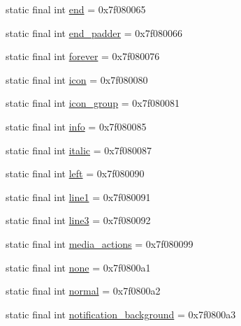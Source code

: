 \begin{DoxyCompactItemize}
\item 
static final int \mbox{\hyperlink{classandroid_1_1support_1_1v4_1_1_r_1_1id_ab07961478cba8046460b156bfe29c5e4}{end}} = 0x7f080065
\item 
static final int \mbox{\hyperlink{classandroid_1_1support_1_1v4_1_1_r_1_1id_a8e2de59a9001feb70cbf25a63296a6c4}{end\+\_\+padder}} = 0x7f080066
\item 
static final int \mbox{\hyperlink{classandroid_1_1support_1_1v4_1_1_r_1_1id_a5883771ab7e95823c127b5d3013e0dfe}{forever}} = 0x7f080076
\item 
static final int \mbox{\hyperlink{classandroid_1_1support_1_1v4_1_1_r_1_1id_a62604496896d5069c3673d6ff13b2dee}{icon}} = 0x7f080080
\item 
static final int \mbox{\hyperlink{classandroid_1_1support_1_1v4_1_1_r_1_1id_a540e31dc0dde6271ea50f4f8d1b86cd5}{icon\+\_\+group}} = 0x7f080081
\item 
static final int \mbox{\hyperlink{classandroid_1_1support_1_1v4_1_1_r_1_1id_af9b4f5497aef6dd0520bfb1b3d5dd026}{info}} = 0x7f080085
\item 
static final int \mbox{\hyperlink{classandroid_1_1support_1_1v4_1_1_r_1_1id_a9996d770f69100664e988763ccf14804}{italic}} = 0x7f080087
\item 
static final int \mbox{\hyperlink{classandroid_1_1support_1_1v4_1_1_r_1_1id_a8e61961887a658253c7357282f98ccba}{left}} = 0x7f080090
\item 
static final int \mbox{\hyperlink{classandroid_1_1support_1_1v4_1_1_r_1_1id_ae38dbdf66d5cc40958bc723bfdeaea89}{line1}} = 0x7f080091
\item 
static final int \mbox{\hyperlink{classandroid_1_1support_1_1v4_1_1_r_1_1id_a0bd6ed4a92b821d9a3dcac27abc038b0}{line3}} = 0x7f080092
\item 
static final int \mbox{\hyperlink{classandroid_1_1support_1_1v4_1_1_r_1_1id_a5002529f1c643c3d506c47c6089bbcf5}{media\+\_\+actions}} = 0x7f080099
\item 
static final int \mbox{\hyperlink{classandroid_1_1support_1_1v4_1_1_r_1_1id_a2a3d35eb1901faba87923c10e16daed0}{none}} = 0x7f0800a1
\item 
static final int \mbox{\hyperlink{classandroid_1_1support_1_1v4_1_1_r_1_1id_a08f13192f229edf6b2cb55f11f679a8e}{normal}} = 0x7f0800a2
\item 
static final int \mbox{\hyperlink{classandroid_1_1support_1_1v4_1_1_r_1_1id_aefd50ba86a9a1bed7ca654118a389ec1}{notification\+\_\+background}} = 0x7f0800a3
\item 

\end{DoxyCompactItemize}
